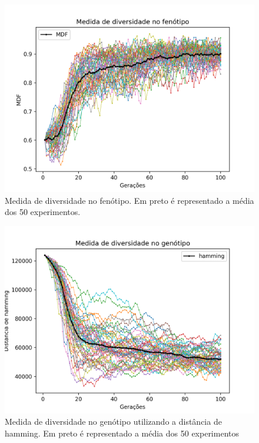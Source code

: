 \documentclass[12pt]{article}
\begin{document}
\begin{figure}
	\centering
	\includegraphics[width=1\textwidth]{imgs/results/0_fitness_vs_gen_mdf.png}
	\caption{Medida de diversidade no fenótipo. Em preto é representado a média dos 50 experimentos.}
\end{figure}

\begin{figure}
	\centering
	\includegraphics[width=1\textwidth]{imgs/results/0_fitness_vs_gen_hamming.png}
	\caption{Medida de diversidade no genótipo utilizando a distância de hamming. Em preto é representado a média dos 50 experimentos}
\end{figure}
\end{document}

